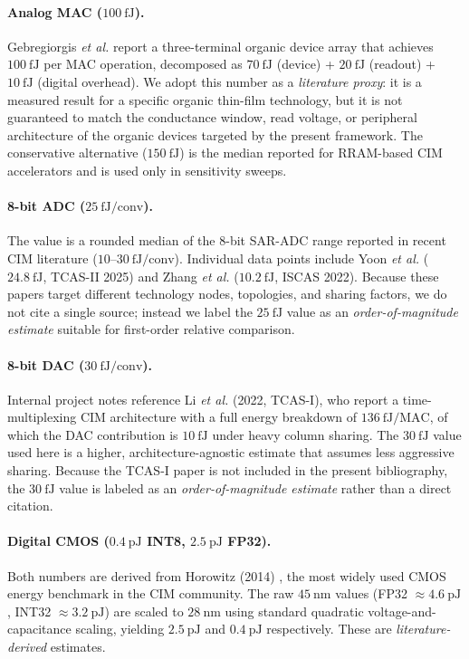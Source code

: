 \paragraph{Analog MAC ($100~\text{fJ}$).}
Gebregiorgis \textit{et al.} \cite{gebregiorgis2023organiccim} report a three-terminal organic device array that achieves $100~\text{fJ}$ per MAC operation, decomposed as $70~\text{fJ}$ (device) + $20~\text{fJ}$ (readout) + $10~\text{fJ}$ (digital overhead).  We adopt this number as a \emph{literature proxy}: it is a measured result for a specific organic thin-film technology, but it is not guaranteed to match the conductance window, read voltage, or peripheral architecture of the organic devices targeted by the present framework.  The conservative alternative ($150~\text{fJ}$) is the median reported for RRAM-based CIM accelerators and is used only in sensitivity sweeps.

\paragraph{8-bit ADC ($25~\text{fJ/conv}$).}
The value is a rounded median of the $8$-bit SAR-ADC range reported in recent CIM literature ($10$--$30~\text{fJ/conv}$).  Individual data points include Yoon \textit{et al.} ($24.8~\text{fJ}$, TCAS-II 2025) and Zhang \textit{et al.} ($10.2~\text{fJ}$, ISCAS 2022).  Because these papers target different technology nodes, topologies, and sharing factors, we do not cite a single source; instead we label the $25~\text{fJ}$ value as an \emph{order-of-magnitude estimate} suitable for first-order relative comparison.

\paragraph{8-bit DAC ($30~\text{fJ/conv}$).}
Internal project notes reference Li \textit{et al.} (2022, TCAS-I), who report a time-multiplexing CIM architecture with a full energy breakdown of $136~\text{fJ/MAC}$, of which the DAC contribution is $10~\text{fJ}$ under heavy column sharing.  The $30~\text{fJ}$ value used here is a higher, architecture-agnostic estimate that assumes less aggressive sharing.  Because the TCAS-I paper is not included in the present bibliography, the $30~\text{fJ}$ value is labeled as an \emph{order-of-magnitude estimate} rather than a direct citation.

\paragraph{Digital CMOS ($0.4~\text{pJ}$ INT8, $2.5~\text{pJ}$ FP32).}
Both numbers are derived from Horowitz (2014) \cite{horowitz2014computing}, the most widely used CMOS energy benchmark in the CIM community.  The raw $45~\text{nm}$ values (FP32 $\approx 4.6~\text{pJ}$, INT32 $\approx 3.2~\text{pJ}$) are scaled to $28~\text{nm}$ using standard quadratic voltage-and-capacitance scaling, yielding $2.5~\text{pJ}$ and $0.4~\text{pJ}$ respectively.  These are \emph{literature-derived} estimates.

